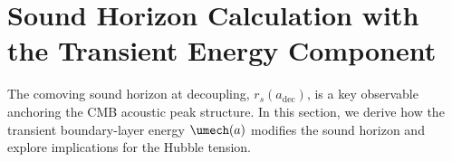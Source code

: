 %
%


\newcommand{\fmech}{\ensuremath{f_{\mathrm{mech}}}}
\newcommand{\ac}{\ensuremath{a_c}}
\newcommand{\sigmamech}{\ensuremath{\sigma_{\mathrm{mech}}}}
\newcommand{\adec}{\ensuremath{a_{\mathrm{dec}}}}
\newcommand{\zdec}{\ensuremath{z_{\mathrm{dec}}}}
\newcommand{\rs}{\ensuremath{r_s}}
\newcommand{\dA}{\ensuremath{d_A}}
\newcommand{\Omm}{\ensuremath{\Omega_m}}
\newcommand{\Omr}{\ensuremath{\Omega_r}}
\newcommand{\Omb}{\ensuremath{\Omega_b}}
\newcommand{\OmL}{\ensuremath{\Omega_\Lambda}}



\section{Sound Horizon Calculation with the Transient Energy Component}
\label{sec:sound_horizon}

The comoving sound horizon at decoupling, $\rs(\adec)$, is a key observable anchoring the CMB acoustic peak structure. In this section, we derive how the transient boundary-layer energy $\umech(a)$ modifies the sound horizon and explore implications for the Hubble tension.

